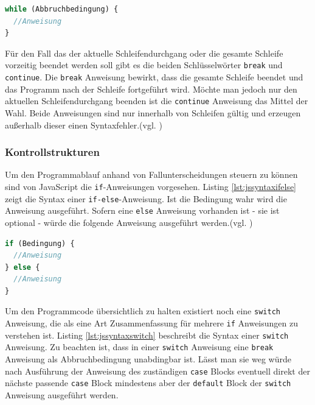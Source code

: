 \vspace{1em}
\begin{lstlisting}[language=JavaScript, caption=Syntax While-Schleife, label=lst:jssyntaxwhile]
while (Abbruchbedingung) {
  //Anweisung
}
\end{lstlisting}
	
Für den Fall das der aktuelle Schleifendurchgang oder die gesamte Schleife vorzeitig beendet werden soll gibt es die beiden Schlüsselwörter \texttt{break} und \texttt{continue}. Die \texttt{break} Anweisung bewirkt, dass die gesamte Schleife beendet und das Programm nach der Schleife fortgeführt wird. Möchte man jedoch nur den aktuellen Schleifendurchgang beenden ist die \texttt{continue} Anweisung das Mittel der Wahl. Beide Anweisungen sind nur innerhalb von Schleifen gültig und erzeugen außerhalb dieser einen Syntaxfehler.(vgl. \cite[S.103f]{FlanJava2007})

\subsubsection{Kontrollstrukturen} Um den Programmablauf anhand von Fallunterscheidungen steuern zu können sind von JavaScript die \texttt{if}-Anweisungen vorgesehen. Listing \ref{lst:jssyntaxifelse} zeigt die Syntax einer \texttt{if-else}-Anweisung. Ist die Bedingung wahr wird die Anweisung ausgeführt. Sofern eine \texttt{else} Anweisung vorhanden ist - sie ist optional - würde die folgende Anweisung ausgeführt werden.(vgl. \cite[S.80]{WenzJava2008})

\vspace{1em}
\begin{lstlisting}[language=JavaScript, caption=Syntax If-else-Anweisung, label=lst:jssyntaxifelse]
if (Bedingung) {
  //Anweisung
} else {
  //Anweisung
}
\end{lstlisting}
	
Um den Programmcode übersichtlich zu halten existiert noch eine \texttt{switch} Anweisung, die als eine Art Zusammenfassung für mehrere \texttt{if} Anweisungen zu verstehen ist. Listing \ref{lst:jssyntaxswitch} beschreibt die Syntax einer \texttt{switch} Anweisung. Zu beachten ist, dass in einer \texttt{switch} Anweisung eine \texttt{break} Anweisung als Abbruchbedingung unabdingbar ist. Lässt man sie weg würde nach Ausführung der Anweisung des zuständigen \texttt{case} Blocks eventuell direkt der nächste passende \texttt{case} Block mindestens aber der \texttt{default} Block der \texttt{switch} Anweisung ausgeführt werden.

